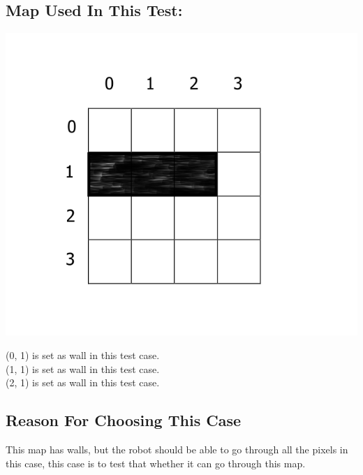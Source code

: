 \documentclass[11pt, a4paper]{report}
\begin{document}
\subsection{Map Used In This Test:}
\begin{center}
\includegraphics[scale=0.4]{./image/Test4.png}
\end{center}

\noindent (0, 1) is set as wall in this test case.\\
(1, 1) is set as wall in this test case.\\
(2, 1) is set as wall in this test case.\\

\subsection{Reason For Choosing This Case}
This map has walls, but the robot should be able to go through all the pixels in this case, this case is to test that whether it can go through this map.
\end{document}
